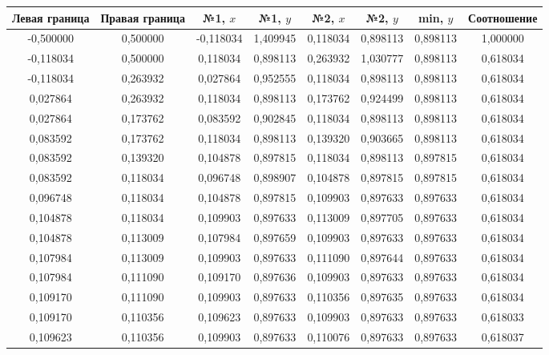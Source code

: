 
\begin{table}
\center
\begin{tabular}{cccccccc}
\toprule
Левая граница & Правая граница 
& №1, $x$ & №1, $y$ 
& №2, $x$ & №2, $y$ 
& min, $y$
  & Соотношение \\
\midrule
-0,500000 & 0,500000 & -0,118034 & 1,409945 & 0,118034 & 0,898113 & 0,898113 & 1,000000 \\
-0,118034 & 0,500000 & 0,118034  & 0,898113 & 0,263932 & 1,030777 & 0,898113 & 0,618034 \\
-0,118034 & 0,263932 & 0,027864  & 0,952555 & 0,118034 & 0,898113 & 0,898113 & 0,618034 \\
0,027864  & 0,263932 & 0,118034  & 0,898113 & 0,173762 & 0,924499 & 0,898113 & 0,618034 \\
0,027864  & 0,173762 & 0,083592  & 0,902845 & 0,118034 & 0,898113 & 0,898113 & 0,618034 \\
0,083592  & 0,173762 & 0,118034  & 0,898113 & 0,139320 & 0,903665 & 0,898113 & 0,618034 \\
0,083592  & 0,139320 & 0,104878  & 0,897815 & 0,118034 & 0,898113 & 0,897815 & 0,618034 \\
0,083592  & 0,118034 & 0,096748  & 0,898907 & 0,104878 & 0,897815 & 0,897815 & 0,618034 \\
0,096748  & 0,118034 & 0,104878  & 0,897815 & 0,109903 & 0,897633 & 0,897633 & 0,618034 \\
0,104878  & 0,118034 & 0,109903  & 0,897633 & 0,113009 & 0,897705 & 0,897633 & 0,618034 \\
0,104878  & 0,113009 & 0,107984  & 0,897659 & 0,109903 & 0,897633 & 0,897633 & 0,618034 \\
0,107984  & 0,113009 & 0,109903  & 0,897633 & 0,111090 & 0,897644 & 0,897633 & 0,618034 \\
0,107984  & 0,111090 & 0,109170  & 0,897636 & 0,109903 & 0,897633 & 0,897633 & 0,618034 \\
0,109170  & 0,111090 & 0,109903  & 0,897633 & 0,110356 & 0,897635 & 0,897633 & 0,618034 \\
0,109170  & 0,110356 & 0,109623  & 0,897633 & 0,109903 & 0,897633 & 0,897633 & 0,618033 \\
0,109623  & 0,110356 & 0,109903  & 0,897633 & 0,110076 & 0,897633 & 0,897633 & 0,618037 \\

\end{tabular}
\end{table}
